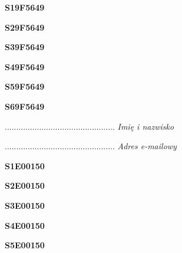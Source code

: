 \begin{turn}{90}\huge \textbf{S19F5649}\end{turn}

\begin{turn}{90}\huge \textbf{S29F5649}\end{turn}

\begin{turn}{90}\huge \textbf{S39F5649}\end{turn}

\begin{turn}{90}\huge \textbf{S49F5649}\end{turn}

\begin{turn}{90}\huge \textbf{S59F5649}\end{turn}

\begin{turn}{90}\huge \textbf{S69F5649}\end{turn}

\begin{turn}{90}\begin{minipage}{\linewidth} \vspace{20mm} ................................................  \textit{Imię i nazwisko}\end{minipage}\end{turn}

\begin{turn}{90}\begin{minipage}{\linewidth} \vspace{20mm} ................................................  \textit{Adres e-mailowy}\end{minipage}\end{turn}

\begin{turn}{90}\huge \textbf{S1E00150}\end{turn}

\begin{turn}{90}\huge \textbf{S2E00150}\end{turn}

\begin{turn}{90}\huge \textbf{S3E00150}\end{turn}

\begin{turn}{90}\huge \textbf{S4E00150}\end{turn}

\begin{turn}{90}\huge \textbf{S5E00150}\end{turn}

